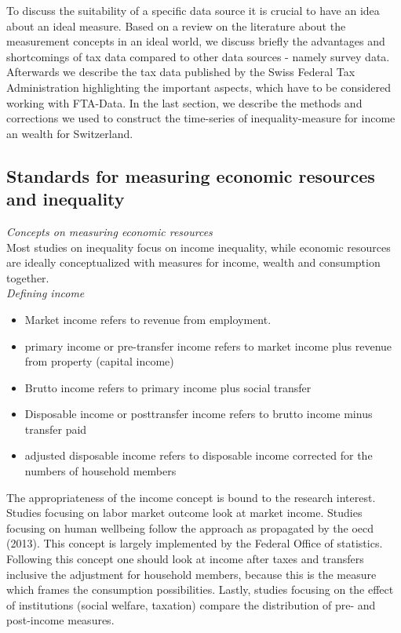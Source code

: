 \documentclass[twoside]{article}\usepackage[]{graphicx}\usepackage[]{color}
\begin{document}
\begin{multicols}{2}
To discuss the suitability of a specific data source it is crucial to have an idea about an ideal measure. Based on a review on the literature about the measurement concepts in an ideal world, we discuss briefly the advantages and shortcomings of tax data compared to other data sources - namely survey data. Afterwards we describe the tax data published by the Swiss Federal Tax Administration highlighting the important aspects, which have to be considered working with FTA-Data. In the last section, we describe the methods and corrections we used to construct the time-series of inequality-measure for income an wealth for Switzerland.

\subsection{Standards for measuring economic resources and inequality}

\emph{Concepts on measuring economic resources}  \\
Most studies on inequality focus on income inequality, while economic resources are ideally conceptualized with measures for income, wealth and consumption together. \\

\emph{Defining income}

\begin{itemize}
\item Market income refers to revenue from employment.
\item primary income or pre-transfer income refers to  market income plus revenue from property (capital income)
\item Brutto income refers to  primary income plus social transfer
\item Disposable income or posttransfer income refers to  brutto income minus transfer paid 
\item adjusted disposable income refers to  disposable income corrected for the numbers of household members 
\end{itemize}

The appropriateness of the income concept is bound to the research interest. Studies focusing on labor market outcome look at market income. Studies focusing on human wellbeing follow the approach as propagated by the oecd (2013). This concept is largely implemented by the Federal Office of statistics. Following this concept one should look at income after taxes and transfers inclusive the adjustment for household members, because this is the measure which frames the consumption possibilities. Lastly, studies focusing on the effect of institutions (social welfare, taxation) compare the distribution of pre- and post-income measures. \\   


\end{multicols}
\end{document}
